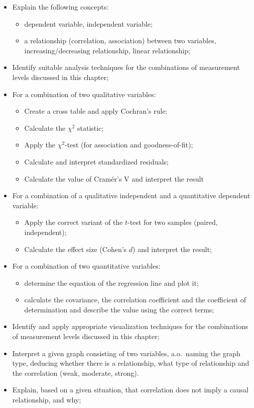 \begin{itemize}
    \item Explain the following concepts:
    \begin{itemize}
        \item dependent variable, independent variable;
        \item a relationship (correlation, association) between two variables, increasing/decreasing relationship, linear relationship;
    \end{itemize}
    \item Identify suitable analysis techniques for the combinations of measurement levels discussed in this chapter;
    \item For a combination of two qualitative variables:
    \begin{itemize}
        \item Create a cross table and apply Cochran's rule;
        \item Calculate the $\chi^2$ statistic;
        \item Apply the $\chi^2$-test (for association and goodness-of-fit);
        \item Calculate and interpret standardized residuals;
        \item Calculate the value of Cramér's V and interpret the result
    \end{itemize}
    \item For a combination of a qualitative independent and a quantitative dependent variable:
    \begin{itemize}
        \item Apply the correct variant of the $t$-test for two samples (paired, independent);
        \item Calculate the effect size (Cohen's $d$) and interpret the result;
    \end{itemize}
    \item For a combination of two quantitative variables:
    \begin{itemize}
        \item determine the equation of the regression line and plot it;
        \item calculate the covariance, the correlation coefficient and the coefficient of determination and describe the value using the correct terms;
    \end{itemize}
    \item Identify and apply appropriate visualization techniques for the combinations of measurement levels discussed in this chapter;
    \item Interpret a given graph consisting of two variables, a.o.~naming the graph type, deducing whether there is a relationship, what type of relationship and the correlation (weak, moderate, strong).
    \item Explain, based on a given situation, that correlation does not imply a causal relationship, and why;
\end{itemize}


